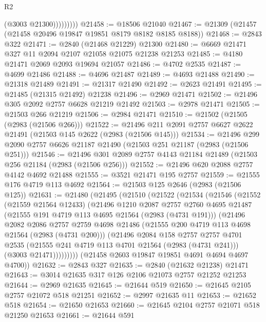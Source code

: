 \begin{lexlean}{R2}
\begin{coremodule}
                    (@3003 @21300)))))))))
@21458 := @18506 @21040
@21467 := @21309 (@21457 (@21458 @20496 @19847 @19851 @8179 @8182 @8185 @8188))
@21468 := @2843 @322
@21471 := @2840 (@21468 @21229) @21300
@21480 := @6669 @21471 @327 @11 @2094 @2107 @21058 @21075 @21238 @21253
@21485 := @4180 @21471 @2069 @2093 @19694 @21057
@21486 := @4702 @2535
@21487 := @4699 @21486
@21488 := @4696 @21487
@21489 := @4693 @21488
@21490 := @21318 @21489
@21491 := @21317 @21490
@21492 := @2623 @21491
@21495 := @21485 (@21315 @21492) @21238
@21496 := @2969 @21471
@21502 := @21496 @305 @2092 @2757 @6628 @21219 @21492
@21503 := @2978 @21471
@21505 := @21503 @266 @21219
@21506 := @2984 @21471
@21510 := @21502 (@21505 (@2983 (@21506 @266)))
@21522 := @21496 @211 @2091 @2757 @6627 @2622 @21491 (@21503 @145 @2622 (@2983 (@21506 @145)))
@21534 := @21496 @299 @2090 @2757 @6626 @21187 @21490 (@21503 @251 @21187 (@2983 (@21506 @251)))
@21546 := @21496 @301 @2089 @2757 @4143 @21184 @21489 (@21503 @256 @21184 (@2983 (@21506 @256)))
@21552 := @21496 @620 @2088 @2757 @4142 @4692 @21488
@21555 := @3521 @21471 @195 @2757
@21559 := @21555 @176 @4719 @113 @4692
@21564 := @21503 @125 @2646 (@2983 (@21506 @125))
@21631 := @21480
    (@21495
      (@21510
        (@21522
          (@21534
            (@21546
              (@21552
                (@21559 @21564 @12433)
                (@21496
                  @1210
                  @2087
                  @2757
                  @2760
                  @4695
                  @21487
                  (@21555 @191 @4719 @113 @4695 @21564 (@2983 (@4731 @191)))
                  (@21496
                    @2082
                    @2086
                    @2757
                    @2759
                    @4698
                    @21486
                    (@21555 @200 @4719 @113 @4698 @21564 (@2983 (@4731 @200)))
                    (@21496
                      @2084
                      @158
                      @2757
                      @2757
                      @4701
                      @2535
                      (@21555 @241 @4719 @113 @4701 @21564 (@2983 (@4731 @241)))
                      (@3003 @21471)))))))))
      (@21458 @2603 @19847 @19851 @4691 @4694 @4697 @4700))
@21632 := @2843 @327
@21635 := @2840 (@21632 @21238) @21471
@21643 := @3014 @21635 @317 @126 @2106 @21073 @2757 @21252 @21253
@21644 := @2969 @21635
@21645 := @21644 @519
@21650 := @21645 @2105 @2757 @21072 @518 @21251
@21652 := @2997 @21635 @11
@21653 := @21652 @518
@21654 := @21650 @21653
@21660 := @21645 @2104 @2757 @21071 @518 @21250 @21653
@21661 := @21644 @591

\end{coremodule}
\end{lexlean}

